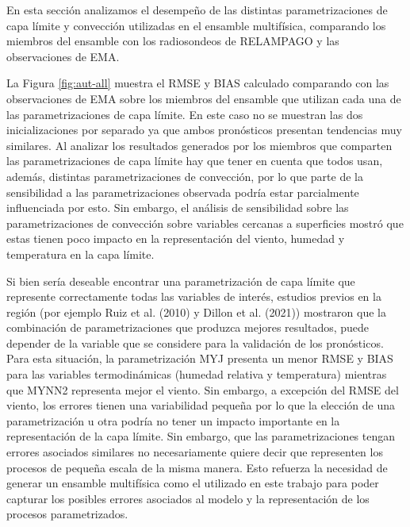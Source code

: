 \documentclass[12pt,oneside,a4paper]{reedthesis}
\begin{document}
En esta sección analizamos el desempeño de las distintas parametrizaciones de capa límite y convección utilizadas en el ensamble multifísica, comparando los miembros del ensamble con los radiosondeos de RELAMPAGO y las observaciones de EMA.

La Figura \ref{fig:aut-all} muestra el RMSE y BIAS calculado comparando con las observaciones de EMA sobre los miembros del ensamble que utilizan cada una de las parametrizaciones de capa límite. En este caso no se muestran las dos inicializaciones por separado ya que ambos pronósticos presentan tendencias muy similares. Al analizar los resultados generados por los miembros que comparten las parametrizaciones de capa límite hay que tener en cuenta que todos usan, además, distintas parametrizaciones de convección, por lo que parte de la sensibilidad a las parametrizaciones observada podría estar parcialmente influenciada por esto. Sin embargo, el análisis de sensibilidad sobre las parametrizaciones de convección sobre variables cercanas a superficies mostró que estas tienen poco impacto en la representación del viento, humedad y temperatura en la capa límite.

Si bien sería deseable encontrar una parametrización de capa límite que represente correctamente todas las variables de interés, estudios previos en la región (por ejemplo Ruiz et al. (2010) y Dillon et al. (2021)) mostraron que la combinación de parametrizaciones que produzca mejores resultados, puede depender de la variable que se considere para la validación de los pronósticos. Para esta situación, la parametrización MYJ presenta un menor RMSE y BIAS para las variables termodinámicas (humedad relativa y temperatura) mientras que MYNN2 representa mejor el viento. Sin embargo, a excepción del RMSE del viento, los errores tienen una variabilidad pequeña por lo que la elección de una parametrización u otra podría no tener un impacto importante en la representación de la capa límite. Sin embargo, que las parametrizaciones tengan errores asociados similares no necesariamente quiere decir que representen los procesos de pequeña escala de la misma manera. Esto refuerza la necesidad de generar un ensamble multifísica como el utilizado en este trabajo para poder capturar los posibles errores asociados al modelo y la representación de los procesos parametrizados.
\end{document}
